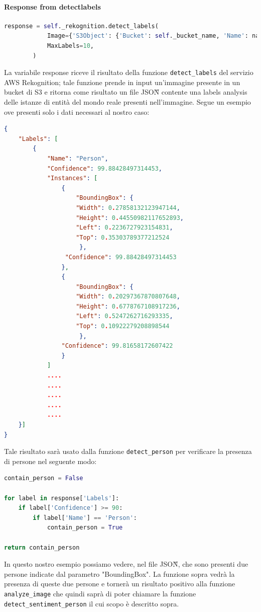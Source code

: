 \paragraph{Response from detect\textunderscore{}labels} \aCapo{}
\begin{lstlisting}[language=Python]
response = self._rekognition.detect_labels(
            Image={'S3Object': {'Bucket': self._bucket_name, 'Name': name_image}},
            MaxLabels=10,
        )
\end{lstlisting}
La variabile response riceve il risultato della funzione \verb+detect_labels+ del servizio AWS Rekognition; tale funzione prende in input un'immagine presente in un bucket di S3 e ritorna come risultato un file JSON\G{} contente una labels analysis delle istanze di entità del mondo reale presenti nell'immagine. Segue un esempio ove presenti solo i dati necessari al nostro caso:
\begin{lstlisting}[language=JSON]
{
	"Labels": [
		{
			"Name": "Person",
            "Confidence": 99.88428497314453,
            "Instances": [
            	{
                	"BoundingBox": {
                    "Width": 0.27858132123947144,
                    "Height": 0.44550982117652893,
                    "Left": 0.2236727923154831,
                    "Top": 0.35303789377212524
                     },
                 "Confidence": 99.88428497314453
                },
				{
                    "BoundingBox": {
                    "Width": 0.20297367870807648,
                    "Height": 0.6778767108917236,
                    "Left": 0.5247262716293335,
                    "Top": 0.10922279208898544
                  	 },
                "Confidence": 99.81658172607422
				}
			]
            ....
            ....
            ....
            ....
        	....
	}]
}
\end{lstlisting}
Tale risultato sarà usato dalla funzione \verb+detect_person+ per verificare la presenza di persone nel seguente modo:
\begin{lstlisting}[language=Python]
contain_person = False

for label in response['Labels']:
    if label['Confidence'] >= 90:
        if label['Name'] == 'Person':
            contain_person = True
            
return contain_person
\end{lstlisting}
In questo nostro esempio possiamo vedere, nel file JSON\G{}, che sono presenti due persone indicate dal parametro "BoundingBox". La funzione sopra vedrà la presenza di queste due persone e tornerà un risultato positivo alla funzione \verb+analyze_image+ che quindi saprà di poter chiamare la funzione \verb+detect_sentiment_person+ il cui scopo è descritto sopra.

